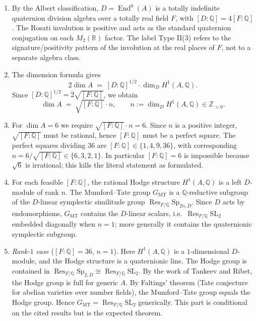 \documentclass{article}
\begin{document}
\begin{enumerate}
\item By the Albert classification, $D = \operatorname{End}^0(A)$ is a totally
indefinite quaternion division algebra over a totally real field $F$, with
$[D:\mathbb{Q}] = 4[F:\mathbb{Q}]$. The Rosati involution is positive and acts as
the standard quaternion conjugation on each $M_2(\mathbb{R})$ factor. The label
Type II(3) refers to the signature/positivity pattern of the involution at the real
places of $F$, not to a separate algebra class.

\item The dimension formula gives
\[
2\dim A \;=\; [D:\mathbb{Q}]^{1/2}\cdot \dim_D H^1(A,\mathbb{Q}).
\]
Since $[D:\mathbb{Q}]^{1/2} = 2\sqrt{[F:\mathbb{Q}]}$, we obtain
\[
\dim A \;=\; \sqrt{[F:\mathbb{Q}]}\cdot n,
\qquad
n := \dim_D H^1(A,\mathbb{Q}) \in \mathbb{Z}_{>0}.
\]

\item For $\dim A = 6$ we require $\sqrt{[F:\mathbb{Q}]}\cdot n = 6$. Since $n$ is a
positive integer, $\sqrt{[F:\mathbb{Q}]}$ must be rational, hence $[F:\mathbb{Q}]$ must
be a perfect square. The perfect squares dividing $36$ are
$[F:\mathbb{Q}] \in \{1,4,9,36\}$, with corresponding
$n = 6/\sqrt{[F:\mathbb{Q}]} \in \{6,3,2,1\}$. In particular $[F:\mathbb{Q}] = 6$ is
impossible because $\sqrt{6}$ is irrational; this kills the literal statement as
formulated.

\item For each feasible $[F:\mathbb{Q}]$, the rational Hodge structure
$H^1(A,\mathbb{Q})$ is a left $D$-module of rank $n$. The Mumford--Tate group
$G_{\mathrm{MT}}$ is a $\mathbb{Q}$-reductive subgroup of the $D$-linear symplectic
similitude group $\operatorname{Res}_{F/\mathbb{Q}} \mathrm{Sp}_{2n,D}$. Since $D$ acts
by endomorphisms, $G_{\mathrm{MT}}$ contains the $D$-linear scalars, i.e.\
$\operatorname{Res}_{F/\mathbb{Q}} \mathrm{SL}_2$ embedded diagonally when $n = 1$;
more generally it contains the quaternionic symplectic subgroup.

\item \emph{Rank-$1$ case} ($[F:\mathbb{Q}] = 36$, $n = 1$). Here $H^1(A,\mathbb{Q})$ is
a $1$-dimensional $D$-module, and the Hodge structure is a quaternionic line. The Hodge
group is contained in $\operatorname{Res}_{F/\mathbb{Q}} \mathrm{Sp}_{2,D} \cong
\operatorname{Res}_{F/\mathbb{Q}} \mathrm{SL}_2$. By the work of Tankeev and Ribet, the
Hodge group is full for generic $A$. By Faltings' theorem (Tate conjecture for abelian
varieties over number fields), the Mumford--Tate group equals the Hodge group. Hence
$G_{\mathrm{MT}} = \operatorname{Res}_{F/\mathbb{Q}} \mathrm{SL}_2$ generically. This
part is conditional on the cited results but is the expected theorem.


\end{enumerate}
\end{document}
